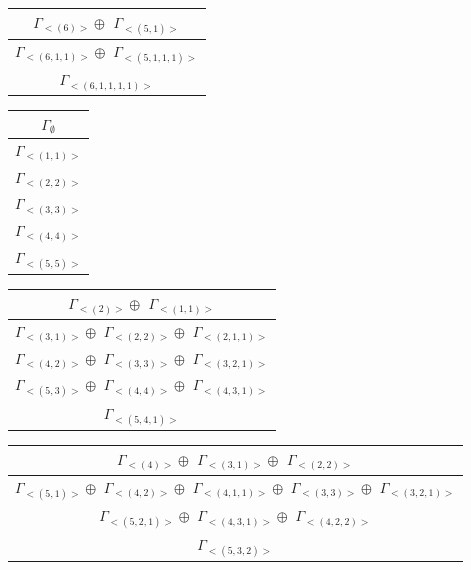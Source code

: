\bigskip
\begin{minipage}{.4\textwidth}
\centering
\begin{tabular}{|c|}\hline
$\Gamma_{<(
6
)>} \oplus$
$\Gamma_{<(
5 , 
1
)>}$
\\ \hline
$\Gamma_{<(
6 , 
1 , 
1
)>} \oplus$
$\Gamma_{<(
5 , 
1 , 
1 , 
1
)>}$
\\ \hline
$\Gamma_{<(
6 , 
1 , 
1 , 
1 , 
1
)>}$
\\
\hline\end{tabular}\end{minipage}
\begin{minipage}{.2\textwidth}
\centering
\begin{tabular}{|c|}\hline
$\Gamma_\emptyset$
\\ \hline
$\Gamma_{<(
1 , 
1
)>}$
\\ \hline
$\Gamma_{<(
2 , 
2
)>}$
\\ \hline
$\Gamma_{<(
3 , 
3
)>}$
\\ \hline
$\Gamma_{<(
4 , 
4
)>}$
\\ \hline
$\Gamma_{<(
5 , 
5
)>}$
\\
\hline\end{tabular}\end{minipage}
\begin{minipage}{.4\textwidth}
\centering
\begin{tabular}{|c|}\hline
$\Gamma_{<(
2
)>} \oplus$
$\Gamma_{<(
1 , 
1
)>}$
\\ \hline
$\Gamma_{<(
3 , 
1
)>} \oplus$
$\Gamma_{<(
2 , 
2
)>} \oplus$
$\Gamma_{<(
2 , 
1 , 
1
)>}$
\\ \hline
$\Gamma_{<(
4 , 
2
)>} \oplus$
$\Gamma_{<(
3 , 
3
)>} \oplus$
$\Gamma_{<(
3 , 
2 , 
1
)>}$
\\ \hline
$\Gamma_{<(
5 , 
3
)>} \oplus$
$\Gamma_{<(
4 , 
4
)>} \oplus$
$\Gamma_{<(
4 , 
3 , 
1
)>}$
\\ \hline
$\Gamma_{<(
5 , 
4 , 
1
)>}$
\\
\hline\end{tabular}\end{minipage}
\bigskip
\begin{minipage}{.57\textwidth}
\centering
\begin{tabular}{|c|}\hline
$\Gamma_{<(
4
)>} \oplus$
$\Gamma_{<(
3 , 
1
)>} \oplus$
$\Gamma_{<(
2 , 
2
)>}$
\\ \hline
$\Gamma_{<(
5 , 
1
)>} \oplus$
$\Gamma_{<(
4 , 
2
)>} \oplus$
$\Gamma_{<(
4 , 
1 , 
1
)>} \oplus$
$\Gamma_{<(
3 , 
3
)>} \oplus$
$\Gamma_{<(
3 , 
2 , 
1
)>}$
\\ \hline
$\Gamma_{<(
5 , 
2 , 
1
)>} \oplus$
$\Gamma_{<(
4 , 
3 , 
1
)>} \oplus$
$\Gamma_{<(
4 , 
2 , 
2
)>}$
\\ \hline
$\Gamma_{<(
5 , 
3 , 
2
)>}$
\\
\hline\end{tabular}\end{minipage}
